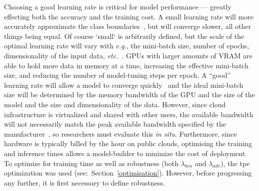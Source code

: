 \documentclass[sn-mathphys-num]{sn-jnl}%
\begin{document}
Choosing a good learning rate is critical for model performance --- greatly effecting both the accuracy and the training cost. A small learning rate will more accurately approximate the class boundaries~\cite{cao2019generalization}, but will converge slower, all other things being equal. Of course `small` is arbitrarily defined, but the scale of the optimal learning rate will vary with \textit{e.g.}, the mini-batch size, number of epochs, dimensionality of the input data, \textit{etc.}~\cite{granziol2022learning}. GPUs with larger amounts of VRAM are able to hold more data in memory at a time, increasing the effective mini-batch size, and reducing the number of model-tuning steps per epoch. A ``good'' learning rate will allow a model to converge quickly~\cite{smith2019super,granziol2022learning} and the ideal mini-batch size will be determined by the memory bandwidth of the GPU and the size of the model and the size and dimensionality of the data. However, since cloud infrastructure is virtualized and shared with other users, the available bandwidth will not necessarily match the peak available bandwidth specified by the manufacturer~\cite{sajid2013cloud}, so researchers must evaluate this \textit{in situ}. Furthermore, since hardware is typically billed by the hour on public clouds, optimising the training and inference times allows a model-builder to minimize the cost of deployment. To optimize for training time as well as robustness (both $\lambda_{ben}$ and $\lambda_{adv}$), the \acrshort{tpe} optimization was used (see:~Section~\ref{optimisation}). However, before progressing any further, it is first necessary to define robustness.
\end{document}
